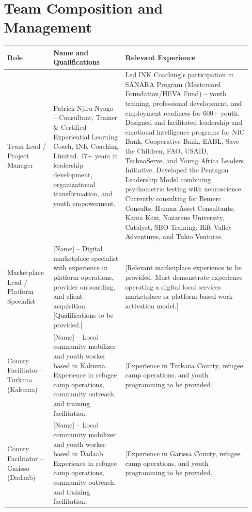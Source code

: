 \documentclass[11pt,a4paper]{article}
\begin{document}
\section{Team Composition and Management}
\begin{longtable}{@{}p{4cm}p{6cm}p{6cm}@{}}
\textbf{Role} & \textbf{Name and Qualifications} & \textbf{Relevant Experience} \\
\hline
Team Lead / Project Manager & Patrick Njiru Nyaga -- Consultant, Trainer \& Certified Experiential Learning Coach, INK Coaching Limited. 17+ years in leadership development, organizational transformation, and youth empowerment. & Led INK Coaching's participation in SANARA Program (Mastercard Foundation/HEVA Fund) -- youth training, professional development, and employment readiness for 600+ youth. Designed and facilitated leadership and emotional intelligence programs for NIC Bank, Cooperative Bank, EABL, Save the Children, FAO, USAID, TechnoServe, and Young Africa Leaders Initiative. Developed the Pentagon Leadership Model combining psychometric testing with neuroscience. Currently consulting for Bemerc Consults, Human Asset Consultants, Kama Kazi, Nazarene University, Catalyst, SBO Training, Rift Valley Adventures, and Tukio Ventures. \\
\hline
Marketplace Lead / Platform Specialist & [Name] -- Digital marketplace specialist with experience in platform operations, provider onboarding, and client acquisition. [Qualifications to be provided.] & [Relevant marketplace experience to be provided. Must demonstrate experience operating a digital local services marketplace or platform-based work activation model.] \\
\hline
County Facilitator -- Turkana (Kakuma) & [Name] -- Local community mobilizer and youth worker based in Kakuma. Experience in refugee camp operations, community outreach, and training facilitation. & [Experience in Turkana County, refugee camp operations, and youth programming to be provided.] \\
\hline
County Facilitator -- Garissa (Dadaab) & [Name] -- Local community mobilizer and youth worker based in Dadaab. Experience in refugee camp operations, community outreach, and training facilitation. & [Experience in Garissa County, refugee camp operations, and youth programming to be provided.] \\
\end{longtable}

\end{document}
